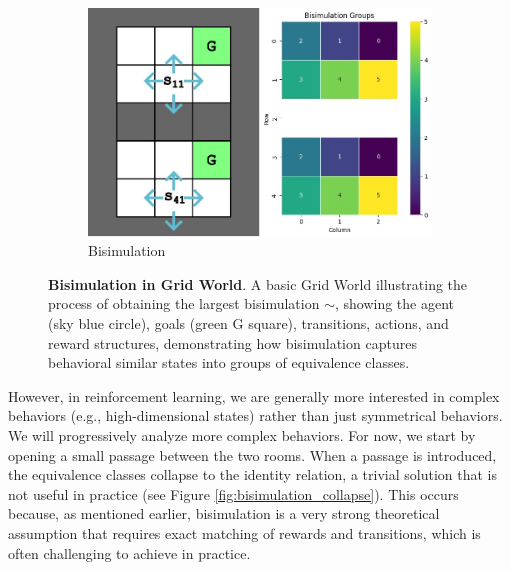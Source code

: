 \begin{figure}[h]
    \hfill
    \begin{subfigure}{0.6\textwidth}
        \includegraphics[width=\linewidth]{Figures/bisimulation.jpg}
        \caption{Bisimulation}
        \label{fig:bisimulation_grid_world}
    \end{subfigure}
    \caption[Bisimulation in Grid World]{\textbf{Bisimulation in Grid World}. A basic Grid World illustrating the process of obtaining the largest bisimulation $\sim$, showing the agent (sky blue circle), goals (green G square), transitions, actions, and reward structures, demonstrating how bisimulation captures behavioral similar states into groups of equivalence classes.}

    \label{fig:outdated_priorities}
\end{figure}


However, in reinforcement learning, we are generally more interested in complex behaviors (e.g., high-dimensional states) rather than just symmetrical behaviors. We will progressively analyze more complex behaviors. For now, we start by opening a small passage between the two rooms. When a passage is introduced, the equivalence classes collapse to the identity relation, a trivial solution that is not useful in practice (see Figure \ref{fig:bisimulation_collapse}). This occurs because, as mentioned earlier, bisimulation is a very strong theoretical assumption that requires exact matching of rewards and transitions, which is often challenging to achieve in practice.


